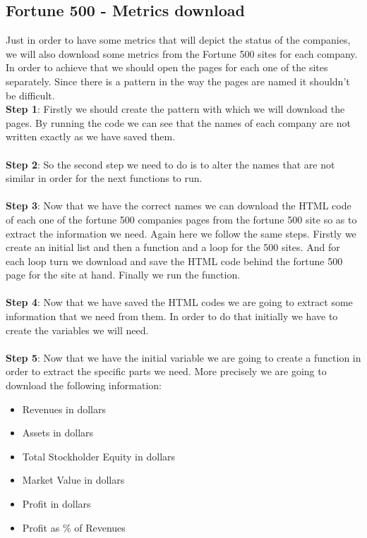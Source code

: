 \documentclass{book}
\begin{document}
\subsection{Fortune 500 - Metrics download}
Just in order to have some metrics that will depict the status of the companies, we will also download some metrics from the Fortune 500 sites for each company.\cite{key35} In order to achieve that we should open the pages for each one of the sites separately. Since there is a pattern in the way the pages are named it shouldn't be difficult.\\
\textbf{Step 1}: Firstly we should create the pattern with which we will download the pages. By running the code we can see that the names of each company are not written exactly as we have saved them.\\\\
\textbf{Step 2}: So the second step we need to do is to alter the names that are not similar in order for the next functions to run.\\\\
\textbf{Step 3}: Now that we have the correct names we can download the HTML code of each one of the fortune 500 companies pages from the fortune 500 site so as to extract the information we need. Again here we follow the same steps. Firstly we create an initial list and then a function and a loop for the 500 sites. And for each loop turn we download and save the HTML code behind the fortune 500 page for the site at hand. Finally we run the function.\\\\
\textbf{Step 4}: Now that we have saved the HTML codes we are going to extract some information that we need from them. In order to do that initially we have to create the variables we will need.\\\\
\textbf{Step 5}: Now that we have the initial variable we are going to create a function in order to extract the specific parts we need. More precisely we are going to download the following information:
\begin{itemize}
\item Revenues in dollars
\item Assets in dollars
\item Total Stockholder Equity in dollars
\item Market Value in dollars
\item Profit in dollars
\item Profit as \% of Revenues
\end{itemize}
\end{document}
